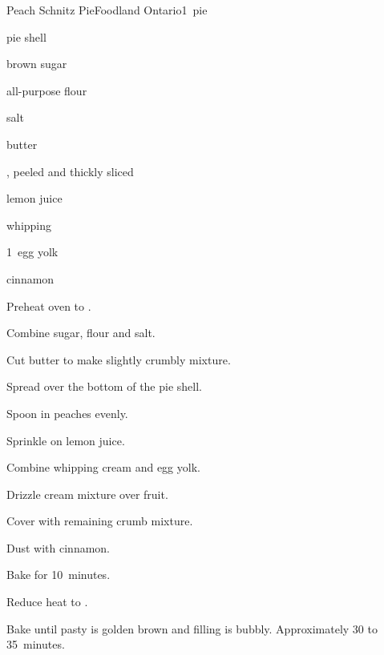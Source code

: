 \begin{recipe}{Peach Schnitz Pie}{Foodland Ontario}{1~pie}

\begin{ingredients}
\item pie shell
\item \C{\twothird} brown sugar
\item {} all-purpose flour
\item salt
\item {} butter
\item {} , peeled and thickly sliced
\item {} lemon juice
\item \C{\quarter} whipping 
\item 1~egg yolk
\item \C{\half} cinnamon
\end{ingredients}

\begin{directions}
\item Preheat oven to .
\item Combine sugar, flour and salt.
\item Cut butter to make slightly crumbly mixture.
\item Spread \third{} over the bottom of the pie shell.
\item Spoon in peaches evenly.
\item Sprinkle on lemon juice.
\item Combine whipping cream and egg yolk.
\item Drizzle cream mixture over fruit.
\item Cover with remaining crumb mixture.
\item Dust with cinnamon.
\item Bake for 10~minutes.
\item Reduce heat to .
\item Bake until pasty is golden brown and filling is bubbly. Approximately 30 to 35~minutes.
\end{directions}

\end{recipe}
